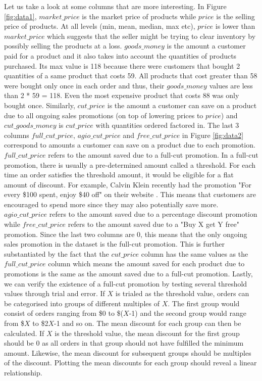 \documentclass[a4paper]{article}
\begin{document}
Let us take a look at some columns that are more interesting. In Figure \ref{fig:data1}, $market\_price$ is the market price of products while $price$ is the selling price of products. At all levels (min, mean, median, max etc), $price$ is lower than $market\_price$ which suggests that the seller might be trying to clear inventory by possibly selling the products at a loss. $goods\_money$ is the amount a customer paid for a product and it also takes into account the quantities of products purchased. Its max value is 118 because there were customers that bought 2 quantities of a same product that costs 59. All products that cost greater than 58 were bought only once in each order and thus, their $goods\_money$ values are less than 2 * 59 = 118. Even the most expensive product that costs 88 was only bought once. Similarly, $cut\_price$ is the amount a customer can save on a product due to all ongoing sales promotions (on top of lowering prices to $price$) and $cut\_goods\_money$ is $cut\_price$ with quantities ordered factored in.
\newline
\newline
The last 3 columns $full\_cut\_price$, $agio\_cut\_price$ and $free\_cut\_price$ in Figure \ref{fig:data2} correspond to amounts a customer can save on a product due to each promotion. $full\_cut\_price$ refers to the amount saved due to a full-cut promotion. In a full-cut promotion, there is usually a pre-determined amount called a threshold. For each time an order satisfies the threshold amount, it would be eligible for a flat amount of discount. For example, Calvin Klein recently had the promotion "For every \$100 spent, enjoy \$40 off" on their website \cite{CK}. This means that customers are encouraged to spend more since they may also potentially save more. $agio\_cut\_price$ refers to the amount saved due to a percentage discount promotion while $free\_cut\_price$ refers to the amount saved due to a "Buy X get Y free" promotion. Since the last two columns are 0, this means that the only ongoing sales promotion in the dataset is the full-cut promotion. This is further substantiated by the fact that the $cut\_price$ column has the same values as the $full\_cut\_price$ column which means the amount saved for each product due to promotions is the same as the amount saved due to a full-cut promotion. Lastly, we can verify the existence of a full-cut promotion by testing several threshold values through trial and error. 
\newline
\newline
If $X$ is trialed as the threshold value, orders can be categorised into groups of different multiples of $X$. The first group would consist of orders ranging from \$0 to \$($X$-1) and the second group would range from \$$X$ to \$2$X$-1 and so on. The mean discount for each group can then be calculated. If $X$ is the threshold value, the mean discount for the first group should be 0 as all orders in that group should not have fulfilled the minimum amount. Likewise, the mean discount for subsequent groups should be multiples of the discount. Plotting the mean discounts for each group should reveal a linear relationship.
\end{document}
